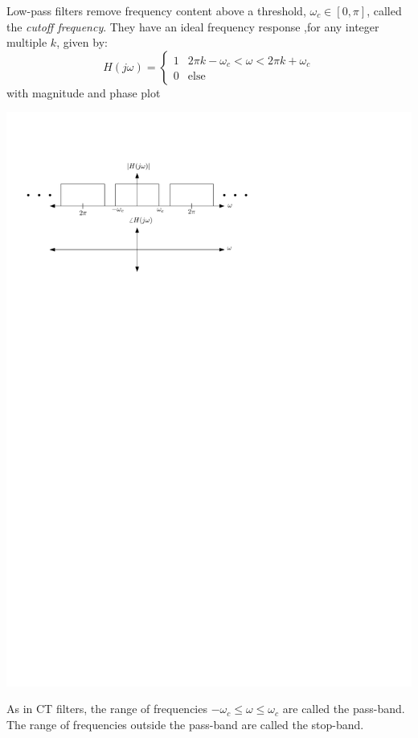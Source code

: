 Low-pass filters remove frequency content above a threshold, $\omega_c \in [0,\pi]$, called the \emph{cutoff frequency}. They have an ideal frequency response ,for any integer multiple $k$, given by:
\[
H(j\omega) = \left\{ \begin{array}{lc}
  1 & 2\pi k -\omega_c < \omega < 2\pi k + \omega_c\\
  0 & \text{else}
\end{array}
\right. 
\]
with magnitude and phase plot
\begin{center}
  \includegraphics[scale=1]{graphics/lowpass-ideal-dt.pdf}
\end{center}
As in CT filters, the range of frequencies $-\omega_c \leq \omega \leq \omega_c$ are called the pass-band. The range of frequencies outside the pass-band are called the stop-band.

